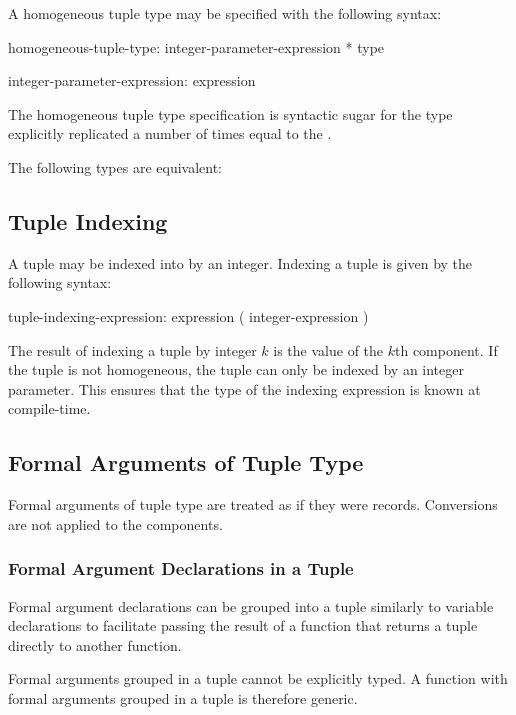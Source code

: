 
A homogeneous tuple type may be specified with the following syntax:
\begin{syntax}
homogeneous-tuple-type:
  integer-parameter-expression * type

integer-parameter-expression:
  expression
\end{syntax}
The homogeneous tuple type specification is syntactic sugar for the
type explicitly replicated a number of times equal to the
.
\begin{example}
The following types are equivalent:
\begin{center}
 \hspace{2pc} 
\end{center}
\end{example}

\subsection{Tuple Indexing}
\label{Tuple_Indexing}

A tuple may be indexed into by an integer.  Indexing a tuple is given
by the following syntax:
\begin{syntax}
tuple-indexing-expression:
  expression ( integer-expression )
\end{syntax}

The result of indexing a tuple by integer $k$ is the value of the
$k$th component.  If the tuple is not homogeneous, the tuple can only
be indexed by an integer parameter.  This ensures that the type of the
indexing expression is known at compile-time.

\subsection{Formal Arguments of Tuple Type}
\label{Formal_Arguments_of_Tuple_Type}


\begin{status}
Formal arguments of tuple type are treated as if they were records.
Conversions are not applied to the components.
\end{status}

\subsubsection{Formal Argument Declarations in a Tuple}
\label{Formal_Argument_Declarations_in_a_Tuple}

Formal argument declarations can be grouped into a tuple similarly to
variable declarations to facilitate passing the result of a function that
returns a tuple directly to another function.

\begin{status}Formal arguments grouped in a tuple cannot be explicitly
typed. A function with formal arguments grouped in a tuple is
therefore generic.
\end{status}
